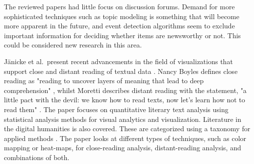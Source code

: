 
The reviewed papers had little focus on discussion forums. Demand for more sophisticated techniques such as topic modeling is something that will become more apparent in the future, and event detection algorithms seem to exclude important information for deciding whether items are newsworthy or not. This could be considered new research in this area.

J{\"a}nicke et al.\ present recent advancements in the field of visualizations that support close and distant reading of textual data \cite{janicke2015on}. Nancy Boyles defines close reading as "reading to uncover layers of meaning that lead to deep comprehension" \cite{boyles2012closing}, whilst Moretti describes distant reading with the statement, "a little pact with the devil: we know how to read texts, now let's learn how not to read them" \cite{moretti2013distant}. The paper focuses on quantitative literary text analysis using statistical analysis methods for visual analytics and visualization. Literature in the digital humanities is also covered. These are categorized using a taxonomy for applied methods \cite{janicke2015on}.
The paper looks at different types of techniques, such as color mapping or heat-maps, for close-reading analysis, distant-reading analysis, and combinations of both.

